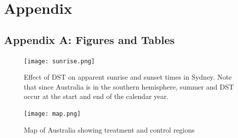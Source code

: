 \newpage
{}
\section*{Appendix}



\FloatBarrier
{}
\subsection*{Appendix A: Figures and Tables}

\begin{figure}[ht]
    \centering
    \texttt{[image: sunrise.png]}
    \caption[Effect of \acs{DST} on apparent sunrise and sunset times in Sydney]{Effect of \acs{DST} on apparent sunrise and sunset times in Sydney. Note that since Australia is in the southern hemisphere, summer and \acs{DST} occur at the start and end of the calendar year.}
    \label{fig:sunrise plot}
\end{figure}

\begin{figure}[ht]
    \centering
    \texttt{[image: map.png]}
    \caption{Map of Australia showing treatment and control regions}
    \label{fig:map}
\end{figure}


